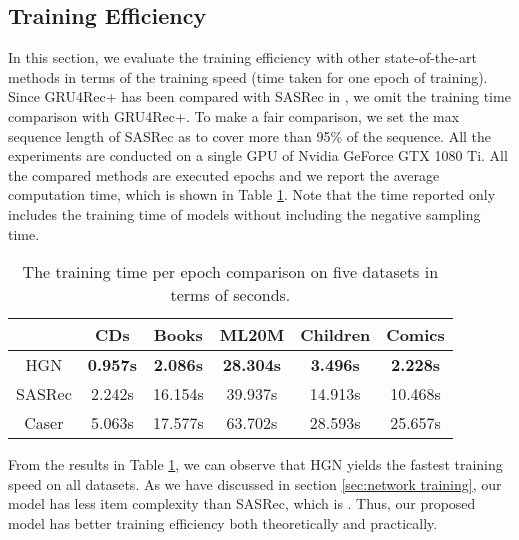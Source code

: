 \documentclass[sigconf]{acmart}
\begin{document}
\subsection{Training Efficiency} \label{sec:training_efficiency}
In this section, we evaluate the training efficiency with other state-of-the-art methods in terms of the training speed (time taken for one epoch of training). Since GRU4Rec+ has been compared with SASRec in \cite{DBLP:conf/icdm/KangM18}, we omit the training time comparison with GRU4Rec+. To make a fair comparison, we set the max sequence length of SASRec as  to cover more than 95\% of the sequence. All the experiments are conducted on a single GPU of Nvidia GeForce GTX 1080 Ti. All the compared methods are executed  epochs and we report the average computation time, which is shown in Table \ref{tab:training_time}. Note that the time reported only includes the training time of models without including the negative sampling time.

\begin{table}[ht]
\centering
\caption{\label{tab:training_time}The training time per epoch comparison on five datasets in terms of seconds.}
\begin{tabular}{ |c|c|c|c|c|c| }
 \hline
 & CDs & Books & ML20M & Children & Comics \\
\hline
HGN & \textbf{0.957s} & \textbf{2.086s} & \textbf{28.304s} & \textbf{3.496s} & \textbf{2.228s} \\
SASRec & 2.242s & 16.154s & 39.937s & 14.913s & 10.468s \\
Caser & 5.063s & 17.577s & 63.702s & 28.593s & 25.657s \\
\hline
\end{tabular}
\vspace{-0.3cm}
\end{table}

From the results in Table \ref{tab:training_time}, we can observe that HGN yields the fastest training speed on all datasets. As we have discussed in section \ref{sec:network training}, our model has less item complexity than SASRec, which is . Thus, our proposed model has better training efficiency both theoretically and practically.
\end{document}
